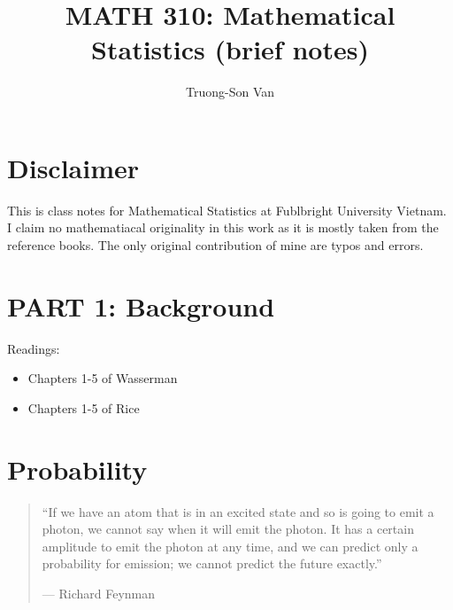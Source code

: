 \documentclass[
  openany]{book}
\title{MATH 310: Mathematical Statistics (brief notes)}
\author{Truong-Son Van}
\date{}
\theoremstyle{definition}
\theoremstyle{definition}
\theoremstyle{definition}
\theoremstyle{definition}
\theoremstyle{remark}
\begin{document}
\maketitle

{
\setcounter{tocdepth}{2}
\tableofcontents
}
\chapter*{Disclaimer}\label{disclaimer}


This is class notes for Mathematical Statistics at Fublbright University Vietnam.
I claim no mathematiacal originality in this work as it is mostly taken from the reference books.
The only original contribution of mine are typos and errors.

\newcommand{\vectorproj}[2][]{\mathrm{proj}_{\vect{#1}}\vect{#2}}
\newcommand{\vectorcomp}[2][]{\mathrm{comp}_{\vect{#1}}\vect{#2}}
\newcommand{\vect}{\mathbf}
\newcommand{\Var}{\mathrm{Var}}
\newcommand{\Cov}{\mathrm{Cov}}
\newcommand{\R}{\mathbb{R}}
\newcommand{\C}{\mathbb{C}}
\newcommand{\eqd}{\stackrel{d}{=}}
\newcommand{\V}{\mathbb{V}}
\newcommand{\N}{\mathbb{N}}
\newcommand{\E}{\mathbb{E}}
\renewcommand{\P}{\mathbb{P}}
\newcommand{\cP}{\mathcal{P}}
\newcommand{\cF}{\mathcal{F}}
\newcommand{\cB}{\mathcal{B}}
\newtheorem{question}{Question}

\chapter*{PART 1: Background}\label{part-1-background}


Readings:

\begin{itemize}
\item
  Chapters 1-5 of Wasserman
\item
  Chapters 1-5 of Rice
\end{itemize}

\chapter{Probability}\label{probability}

\begin{quote}
``If we have an atom that is in an excited state and so is going to emit a photon, we cannot say when it will emit the photon. It has a certain amplitude to emit the photon at any time, and we can predict only a probability for emission; we cannot predict the future exactly.''

\hfill --- Richard Feynman
\end{quote}
\end{document}
